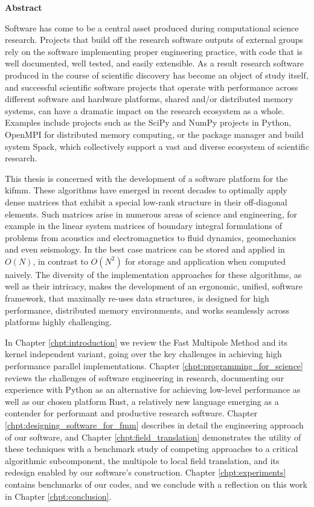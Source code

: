\thispagestyle{plain}

\begin{center}
    \textbf{Abstract}
\end{center}

Software has come to be a central asset produced during
computational science research. Projects that build off the research software outputs of external groups rely on the software implementing proper engineering practice,
with code that is well documented, well tested, and easily extensible. As a
result research software produced in the course of scientific discovery has
become an object of study itself, and successful scientific software projects
that operate with performance across different software and hardware platforms,
shared and/or distributed memory systems, can have a dramatic impact on the
research ecosystem as a whole. Examples include projects such as the SciPy and
NumPy projects in Python, OpenMPI for distributed memory computing, or the package
manager and build system Spack, which collectively support a vast and diverse ecosystem of scientific
research.

This thesis is concerned with the development of a software platform
for the \acrfull{kifmm}. These algorithms have emerged in recent decades to
optimally apply dense matrices that exhibit
a special low-rank structure in their off-diagonal elements. Such matrices arise
in numerous areas of science and engineering, for example in the linear system
matrices of boundary integral formulations of problems from acoustics and
electromagnetics to fluid dynamics, geomechanics and even seismology. In the
best case matrices can be stored and applied in $O(N)$, in contrast
to $O(N^2)$ for storage and application when computed
naively. The diversity of the implementation approaches for these algorithms, as
well as their intricacy, makes the development of an ergonomic,
unified, software framework, that maximally re-uses data structures, is designed
for high performance, distributed memory environments, and works seamlessly
across platforms highly challenging.

In Chapter \ref{chpt:introduction} we review the Fast Multipole Method and its kernel independent variant, going over the key challenges in achieving high performance parallel implementations. Chapter \ref{chpt:programming_for_science} reviews the challenges of software engineering in research, documenting our experience with Python as an alternative for achieving low-level performance as well as our chosen platform Rust, a relatively new language emerging as a contender for performant and productive research software. Chapter \ref{chpt:designing_software_for_fmm} describes in detail the engineering approach of our software, and Chapter \ref{chpt:field_translation} demonstrates the utility of these techniques with a benchmark study of competing approaches to a critical algorithmic subcomponent, the multipole to local field translation, and its redesign enabled by our software's construction. Chapter \ref{chpt:experiments} contains benchmarks of our codes, and we conclude with a reflection on this work in Chapter \ref{chpt:conclusion}.
